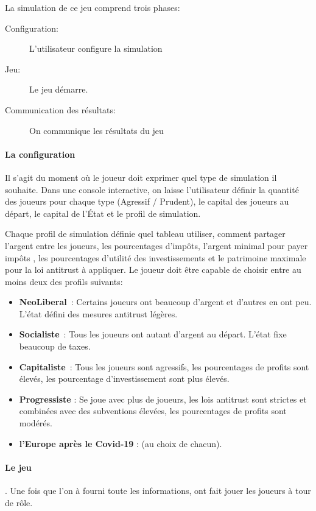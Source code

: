 \documentclass[12pt]{article}
\begin{document}
 La simulation de ce jeu comprend trois phases:
 \begin{description} 
 	\item [Configuration:] L'utilisateur configure la simulation
	\item [Jeu:] Le jeu démarre. 
	\item [Communication des résultats:] On communique les résultats du jeu  
\end{description}
 
 
 \paragraph{La configuration} Il s'agit du moment où le joueur doit exprimer quel type de simulation il souhaite. 
	Dans une console interactive, on laisse  l'utilisateur définir la quantité des joueurs pour chaque type (Agressif / Prudent), le capital des joueurs au départ, le capital de l'État et le profil de simulation. 
 
  Chaque profil de simulation définie quel tableau utiliser, comment partager l'argent entre les joueurs, les pourcentages d'impôts, l'argent minimal pour payer impôts , les pourcentages d'utilité des investissements et le patrimoine maximale pour la loi antitrust à appliquer. 
  Le joueur doit être capable de choisir entre au moins deux des profils suivants: 
  \begin{itemize}
  	\item \textbf{NeoLiberal}~: Certains joueurs ont beaucoup d'argent et d'autres en ont peu. L'état défini des mesures antitrust légères.
  	\item \textbf{Socialiste}~: Tous les joueurs ont autant d'argent au départ. L'état fixe beaucoup de taxes.
  	\item \textbf{Capitaliste}~: Tous les joueurs sont agressifs, les pourcentages de profits sont élevés,  les pourcentage d'investissement sont plus élevés.
  	\item \textbf{Progressiste} : Se joue avec plus de joueurs, les lois antitrust sont strictes et combinées avec des subventions élevées, les pourcentages de profits sont modérés.
  	\item \textbf{l'Europe après le Covid-19} : (au choix de chacun).
\end{itemize}
 
 
  \paragraph{Le jeu}. 
  	Une fois que l'on à fourni toute les informations, ont fait jouer les joueurs à tour de rôle.
	
\end{document}
